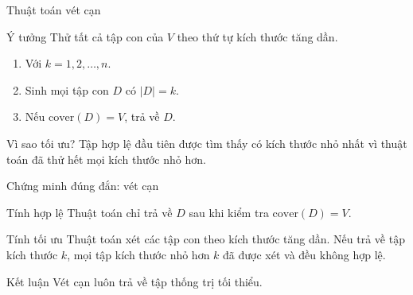 \documentclass[aspectratio=169, 11pt]{beamer}
\begin{document}
\begin{frame}{Thuật toán vét cạn}
  \begin{block}{Ý tưởng}
    Thử tất cả tập con của $V$ theo thứ tự kích thước tăng dần.
  \end{block}

  \begin{enumerate}
    \item Với $k=1,2,\ldots,n$.
    \item Sinh mọi tập con $D$ có $|D|=k$.
    \item Nếu $\mathrm{cover}(D)=V$, trả về $D$.
  \end{enumerate}

  \begin{block}{Vì sao tối ưu?}
    Tập hợp lệ đầu tiên được tìm thấy có kích thước nhỏ nhất vì thuật toán đã thử hết mọi kích thước nhỏ hơn.
  \end{block}
\end{frame}
\begin{frame}{Chứng minh đúng đắn: vét cạn}
  \begin{block}{Tính hợp lệ}
    Thuật toán chỉ trả về $D$ sau khi kiểm tra $\mathrm{cover}(D)=V$.
  \end{block}

  \begin{block}{Tính tối ưu}
    Thuật toán xét các tập con theo kích thước tăng dần.
    Nếu trả về tập kích thước $k$, mọi tập kích thước nhỏ hơn $k$ đã được xét và đều không hợp lệ.
  \end{block}

  \begin{alertblock}{Kết luận}
    Vét cạn luôn trả về tập thống trị tối thiểu.
  \end{alertblock}
\end{frame}
\end{document}
